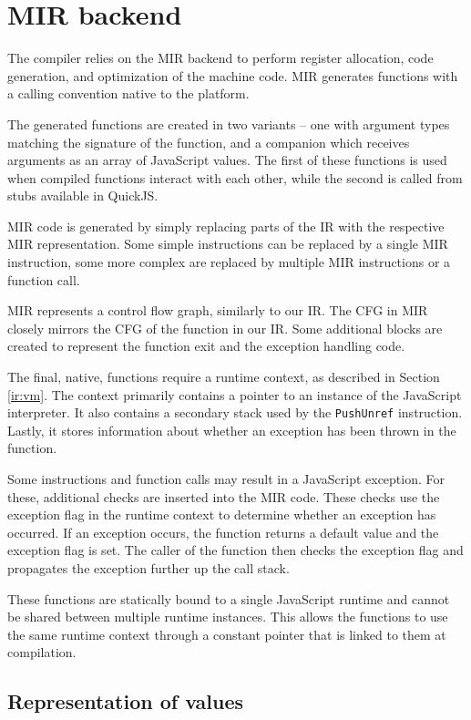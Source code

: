 \pagebreak
\section{MIR backend}

The compiler relies on the MIR backend to perform register allocation, code generation, and optimization of the machine code. MIR generates functions with a calling convention native to the platform.

The generated functions are created in two variants -- one with argument types matching the signature of the function, and a companion which receives arguments as an array of JavaScript values. The first of these functions is used when compiled functions interact with each other, while the second is called from stubs available in QuickJS.

MIR code is generated by simply replacing parts of the IR with the respective MIR representation. Some simple instructions can be replaced by a single MIR instruction, some more complex are replaced by multiple MIR instructions or a function call.

MIR represents a control flow graph, similarly to our IR. The CFG in MIR closely mirrors the CFG of the function in our IR. Some additional blocks are created to represent the function exit and the exception handling code.

The final, native, functions require a runtime context, as described in Section \ref{ir:vm}. The context primarily contains a pointer to an instance of the JavaScript interpreter. It also contains a secondary stack used by the \texttt{PushUnref} instruction. Lastly, it stores information about whether an exception has been thrown in the function.

Some instructions and function calls may result in a JavaScript exception. For these, additional checks are inserted into the MIR code. These checks use the exception flag in the runtime context to determine whether an exception has occurred. If an exception occurs, the function returns a default value and the exception flag is set. The caller of the function then checks the exception flag and propagates the exception further up the call stack.

These functions are statically bound to a single JavaScript runtime and cannot be shared between multiple runtime instances. This allows the functions to use the same runtime context through a constant pointer that is linked to them at compilation.


\subsection{Representation of values}

